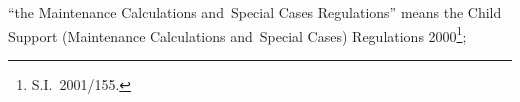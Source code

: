 \documentclass[12pt,a4paper]{article}
\begin{document}
\begin{enumerate}
“the Maintenance Calculations and~Special Cases Regulations” means the Child Support (Maintenance Calculations and~Special Cases) Regulations 2000\footnote{\frenchspacing S.I.~2001/155.};


%


%
%


\end{enumerate}
\end{document}
